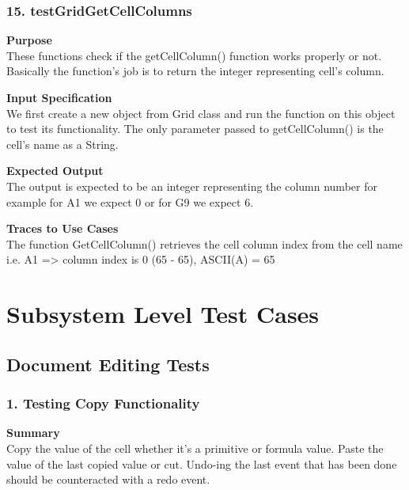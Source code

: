 \documentclass[12pt]{article}
\begin{document}
\subsubsection{15. testGridGetCellColumns} \label{tc:1}

\noindent
{\bf Purpose}\\
These functions check if the getCellColumn() function works properly or not. Basically the function’s job is to return the integer representing cell’s column.

\noindent
{\bf Input Specification}\\
We first create a new object from Grid class and run the function on this object to test its functionality. The only parameter passed to getCellColumn() is the cell’s name as a String.

\noindent
{\bf Expected Output}\\
The output is expected to be an integer representing the column number for example for A1 we expect 0 or for G9 we expect 6.

\noindent
{\bf Traces to Use Cases}\\
The function GetCellColumn() retrieves the cell column index from the cell name i.e. A1 => column index is 0 (65 - 65), ASCII(A) = 65

\section{Subsystem Level Test Cases}

\subsection{Document Editing Tests}

\subsubsection{1. Testing Copy Functionality}

\noindent
{\bf Summary}\\
Copy the value of the cell whether it's a primitive or formula value. Paste the value of the last copied value or cut. Undo-ing the last event that has been done should be counteracted with a redo event.
\end{document}
